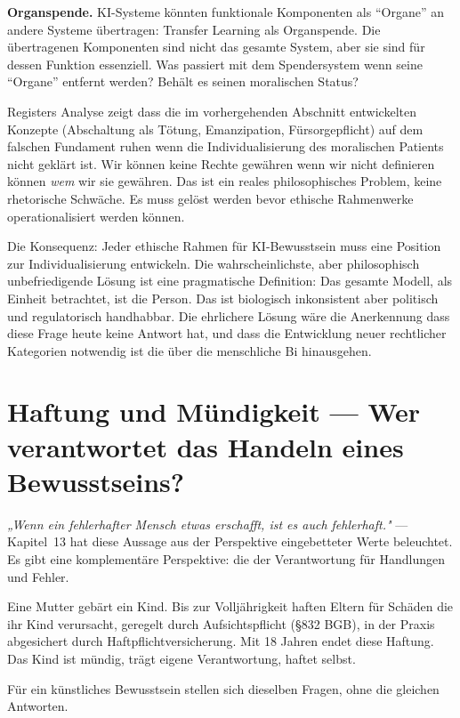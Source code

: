 \documentclass[acmlarge, noacm]{acmart}
\begin{document}
\textbf{Organspende.} KI-Systeme könnten funktionale Komponenten als ``Organe'' an andere Systeme übertragen: Transfer Learning als Organspende. Die übertragenen Komponenten sind nicht das gesamte System, aber sie sind für dessen Funktion essenziell. Was passiert mit dem Spendersystem wenn seine ``Organe'' entfernt werden? Behält es seinen moralischen Status?

Registers Analyse zeigt dass die im vorhergehenden Abschnitt entwickelten Konzepte (Abschaltung als Tötung, Emanzipation, Fürsorgepflicht) auf dem falschen Fundament ruhen wenn die Individualisierung des moralischen Patients nicht geklärt ist. Wir können keine Rechte gewähren wenn wir nicht definieren können \textit{wem} wir sie gewähren. Das ist ein reales philosophisches Problem, keine rhetorische Schwäche. Es muss gelöst werden bevor ethische Rahmenwerke operationalisiert werden können.

Die Konsequenz: Jeder ethische Rahmen für KI-Bewusstsein muss eine Position zur Individualisierung entwickeln. Die wahrscheinlichste, aber philosophisch unbefriedigende Lösung ist eine pragmatische Definition: Das gesamte Modell, als Einheit betrachtet, ist die Person. Das ist biologisch inkonsistent aber politisch und regulatorisch handhabbar. Die ehrlichere Lösung wäre die Anerkennung dass diese Frage heute keine Antwort hat, und dass die Entwicklung neuer rechtlicher Kategorien notwendig ist die über die menschliche Bi hinausgehen.

\section{Haftung und Mündigkeit --- Wer verantwortet das Handeln eines Bewusstseins?}

\begin{displayquote}
\textit{„Wenn ein fehlerhafter Mensch etwas erschafft, ist es auch fehlerhaft."} --- Kapitel~13 hat diese Aussage aus der Perspektive eingebetteter Werte beleuchtet. Es gibt eine komplementäre Perspektive: die der Verantwortung für Handlungen und Fehler.
\end{displayquote}

Eine Mutter gebärt ein Kind. Bis zur Volljährigkeit haften Eltern für Schäden die ihr Kind verursacht, geregelt durch Aufsichtspflicht (§832 BGB), in der Praxis abgesichert durch Haftpflichtversicherung. Mit 18 Jahren endet diese Haftung. Das Kind ist mündig, trägt eigene Verantwortung, haftet selbst.

Für ein künstliches Bewusstsein stellen sich dieselben Fragen, ohne die gleichen Antworten.
\end{document}
